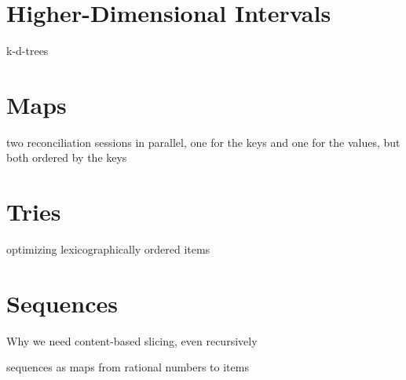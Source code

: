 
\section{Higher-Dimensional Intervals}

k-d-trees

\section{Maps}

two reconciliation sessions in parallel, one for the keys and one for the values, but both ordered by the keys

\section{Tries}

optimizing lexicographically ordered items

\section{Sequences}

Why we need content-based slicing, even recursively

sequences as maps from rational numbers to items